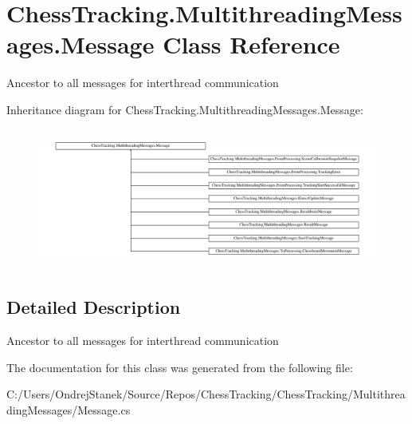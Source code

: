 \hypertarget{class_chess_tracking_1_1_multithreading_messages_1_1_message}{}\section{Chess\+Tracking.\+Multithreading\+Messages.\+Message Class Reference}
\label{class_chess_tracking_1_1_multithreading_messages_1_1_message}


Ancestor to all messages for interthread communication  


Inheritance diagram for Chess\+Tracking.\+Multithreading\+Messages.\+Message\+:\begin{figure}[H]
\begin{center}
\leavevmode
\includegraphics[height=4.623853cm]{class_chess_tracking_1_1_multithreading_messages_1_1_message}
\end{center}
\end{figure}


\subsection{Detailed Description}
Ancestor to all messages for interthread communication 



The documentation for this class was generated from the following file\+:\begin{DoxyCompactItemize}
\item 
C\+:/\+Users/\+Ondrej\+Stanek/\+Source/\+Repos/\+Chess\+Tracking/\+Chess\+Tracking/\+Multithreading\+Messages/Message.\+cs\end{DoxyCompactItemize}
